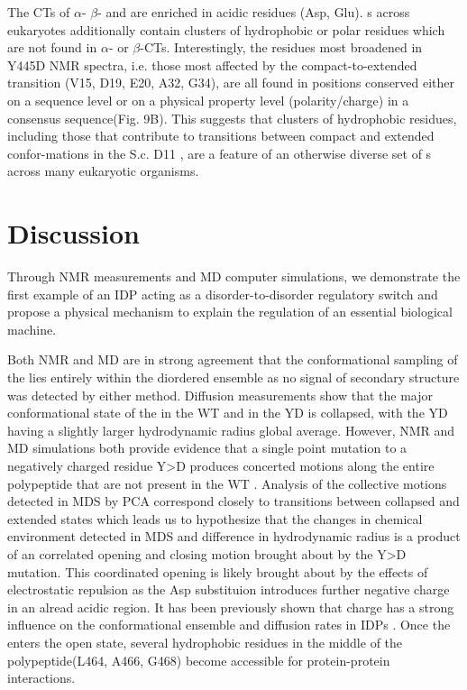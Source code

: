 The CTs of $\alpha$- $\beta$- and \tub are enriched in acidic residues (Asp, Glu). \gct s across eukaryotes additionally contain clusters of hydrophobic or polar residues which are not found in $\alpha$- or $\beta$-CTs. Interestingly, the residues most broadened in Y445D NMR spectra, i.e. those most affected by the compact-to-extended transition (V15, D19, E20, A32, G34), are all found in positions conserved either on a sequence level or on a physical property level (polarity/charge) in a consensus \gct sequence(Fig. 9B). This suggests that clusters of hydrophobic residues, including those that contribute to transitions between compact and extended confor-mations in the S.c. D11 \gct, are a feature of an otherwise diverse set of \gct s across many eukaryotic organisms.


\section{Discussion}

Through NMR measurements and MD computer simulations, we demonstrate the first example of an IDP acting as a disorder-to-disorder regulatory switch and propose a physical mechanism to explain the regulation of an essential biological machine. 

Both NMR and MD are in strong agreement that the conformational sampling of the \gct lies entirely within the diordered ensemble as no signal of secondary structure was detected by either method. Diffusion measurements show that the major conformational state of the \gct in the WT and in the YD is collapsed, with the YD having a slightly larger hydrodynamic radius global average. However, NMR and MD simulations both provide evidence that a single point mutation to a negatively charged residue Y>D produces concerted motions along the entire polypeptide that are not present in the WT \gct. Analysis of the collective motions detected in MDS by PCA correspond closely to transitions between collapsed and extended states which leads us to hypothesize that the changes in chemical environment detected in MDS and difference in hydrodynamic radius is a product of an correlated opening and closing motion brought about by the Y>D mutation. This coordinated opening is likely brought about by the effects of electrostatic repulsion as the Asp substituion introduces further negative charge in an alread acidic region. It has been previously shown that charge has a strong influence on the conformational ensemble and diffusion rates in IDPs \cite{mao2010net}. Once the \gct enters the open state, several hydrophobic residues in the middle of the polypeptide(L464, A466, G468) become accessible for protein-protein interactions.

